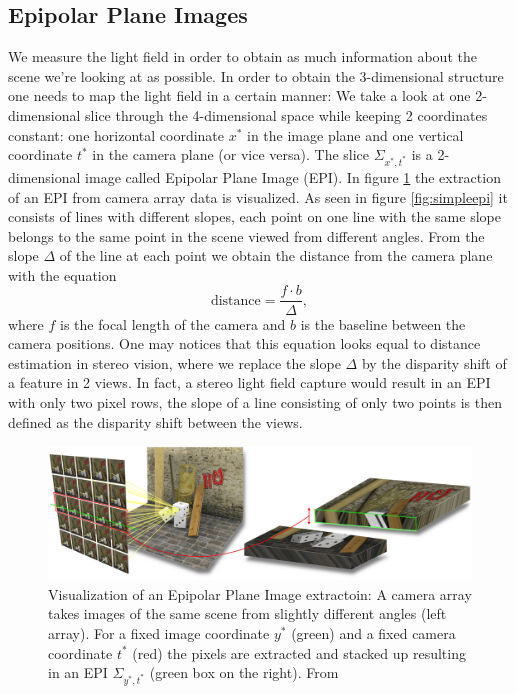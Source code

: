\documentclass  [
  paper    = a4,
  BCOR     = 10mm,
  twoside,
  fontsize = 12pt,
  fleqn,
  toc      = bibnumbered,
  toc      = listofnumbered,
  numbers  = noendperiod,
  headings = normal,
  listof   = leveldown,
  version  = 3.03
]                                       {scrreprt}
\begin{document}
\subsection{Epipolar Plane Images}
\label{sec:epi}
We measure the light field in order to obtain as much information about the scene we're looking at as possible. In order to obtain the 3-dimensional structure one needs to map the light field in a certain manner: We take a look at one 2-dimensional slice through the 4-dimensional space while keeping 2 coordinates constant: one horizontal coordinate  $x^{*}$  in the image plane and one vertical coordinate $t^{*}$ in the camera plane (or vice versa). The slice $\Sigma_{x^{*}, t^{*}}$ is a 2-dimensional image called Epipolar Plane Image (EPI). In figure \ref{fig:epivisualization} the extraction of an EPI from camera array data is visualized. As seen in figure \ref{fig:simpleepi} it consists of lines with different slopes, each point on one line with the same slope belongs to the same point in the scene viewed from different angles. From the slope $\Delta$ of the line at each point we obtain the distance from the camera plane with the equation
\begin{equation}\label{eq:distance}
\text{distance} = \frac{f\cdot b}{\Delta},
\end{equation}
where $f$ is the focal length of the camera and $b$ is the baseline between the camera positions. One may notices that this equation looks equal to distance estimation in stereo vision, where we replace the slope $\Delta$ by the disparity shift of a feature in 2 views. In fact, a stereo light field capture would result in an EPI with only two pixel rows, the slope of a line consisting of only two points is then defined as the disparity shift between the views.

\begin{figure}
	\centering
	\includegraphics[width=1\linewidth]{images/epiVisualization}
	\caption[Visualization of an EPI extraction]{Visualization of an Epipolar Plane Image extractoin: A camera array takes images of the same scene from slightly different angles (left array). For a fixed image coordinate $y^*$ (green) and a fixed camera coordinate $t^*$ (red) the pixels are extracted and stacked up resulting in an EPI $\Sigma_{y^*, t^*}$ (green box on the right). From \cite{iwr.uni-heidelberg.de} }
	\label{fig:epivisualization}
\end{figure}
\end{document}
